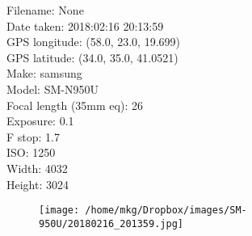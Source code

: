 \clearpage
\recalctypearea
\newpage
\noindent
Filename: None\\ 
Date taken: 2018:02:16 20:13:59\\ 
GPS longitude: (58.0, 23.0, 19.699)\\ 
GPS latitude: (34.0, 35.0, 41.0521)\\ 
Make: samsung\\ 
Model: SM-N950U\\ 
Focal length (35mm eq): 26\\ 
Exposure: 0.1\\ 
F stop: 1.7\\ 
ISO: 1250\\ 
Width: 4032\\ 
Height: 3024\\ 

\clearpage
\recalctypearea
\newpage
\noindent
\begin{figure}
    \texttt{[image: /home/mkg/Dropbox/images/SM-950U/20180216\_201359.jpg]}
\end{figure}


